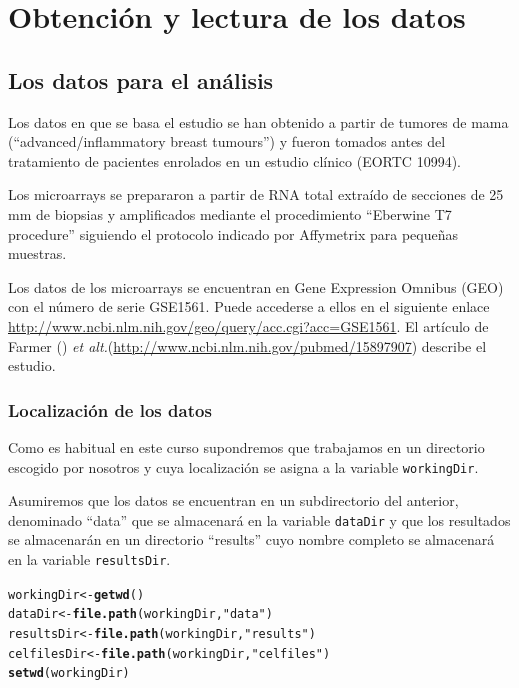 \documentclass[a4paper]{article}\usepackage[]{graphicx}\usepackage[]{color}
\makeatletter
\newcommand{\hlstr}[1]{\textcolor[rgb]{0.192,0.494,0.8}{#1}}%
\newcommand{\hlstd}[1]{\textcolor[rgb]{0.345,0.345,0.345}{#1}}%
\newcommand{\hlkwb}[1]{\textcolor[rgb]{0.69,0.353,0.396}{#1}}%
\newcommand{\hlkwd}[1]{\textcolor[rgb]{0.737,0.353,0.396}{\textbf{#1}}}%
\newenvironment{kframe}{%
 \def\at@end@of@kframe{}%
 \ifinner\ifhmode%
  \def\at@end@of@kframe{\end{minipage}}%
  \begin{minipage}{\columnwidth}%
 \fi\fi%
 \def\FrameCommand##1{\hskip\@totalleftmargin \hskip-\fboxsep
 \colorbox{shadecolor}{##1}\hskip-\fboxsep
     \hskip-\linewidth \hskip-\@totalleftmargin \hskip\columnwidth}%
 \MakeFramed {\advance\hsize-\width
   \@totalleftmargin\z@ \linewidth\hsize
   \@setminipage}}%
 {\par\unskip\endMakeFramed%
 \at@end@of@kframe}
\newenvironment{knitrout}{}{} %
\newcommand{\etal}{{\it et alt.}}
\makeatother
\begin{document}
\section{Obtención y lectura de los datos}

\subsection{Los datos para el análisis}

Los datos en que se basa el estudio se han obtenido a partir de tumores de mama (``advanced/inflammatory breast tumours'') y fueron tomados antes del tratamiento de pacientes enrolados en un estudio clínico (EORTC 10994). 

Los microarrays se prepararon a partir de RNA total extraído de secciones de 25 mm de biopsias y amplificados mediante el procedimiento ``Eberwine T7 procedure'' siguiendo el protocolo indicado por Affymetrix para pequeñas muestras.

Los datos de los microarrays se encuentran en Gene Expression Omnibus (GEO) con el número de serie GSE1561. Puede accederse a ellos  en el siguiente enlace \url{http://www.ncbi.nlm.nih.gov/geo/query/acc.cgi?acc=GSE1561}. El artículo de Farmer (\cite{Farmer2005}) \etal (\url{http://www.ncbi.nlm.nih.gov/pubmed/15897907}) describe el estudio.

\subsubsection{Localización de los datos }

Como es habitual en este curso supondremos que trabajamos en un directorio 
escogido por nosotros y cuya localización se asigna a la variable \texttt{workingDir}.

Asumiremos que los datos se encuentran en un subdirectorio del anterior, denominado ``data'' que se almacenará en la variable \texttt{dataDir} y que los resultados se almacenarán en un directorio ``results'' cuyo nombre completo se almacenará en la variable  \texttt{resultsDir}.

\begin{knitrout}
\color{fgcolor}\begin{kframe}
\begin{alltt}
\hlstd{workingDir} \hlkwb{<-}\hlkwd{getwd}\hlstd{()}
\hlstd{dataDir} \hlkwb{<-}\hlkwd{file.path}\hlstd{(workingDir,} \hlstr{"data"}\hlstd{)}
\hlstd{resultsDir} \hlkwb{<-} \hlkwd{file.path}\hlstd{(workingDir,}\hlstr{"results"}\hlstd{)}
\hlstd{celfilesDir} \hlkwb{<-} \hlkwd{file.path}\hlstd{(workingDir,}\hlstr{"celfiles"}\hlstd{)}
\hlkwd{setwd}\hlstd{(workingDir)}
\end{alltt}
\end{kframe}
\end{knitrout}
\end{document}
